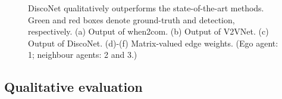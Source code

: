 \documentclass{article}
\begin{document}
\begin{figure}[t]
\centering
{}\centering
\caption{DiscoNet qualitatively outperforms the state-of-the-art methods. Green and red boxes denote ground-truth and detection, respectively.  (a) Output of when2com. (b) Output of V2VNet. (c) Output of DiscoNet. (d)-(f) Matrix-valued edge weights. (Ego agent: 1; neighbour agents: 2 and 3.)}
\label{fig:qualitativecom}
	\vspace{-6mm}
\end{figure}


\vspace{-3mm}
\subsection{Qualitative evaluation}
\vspace{-3mm}
\end{document}
